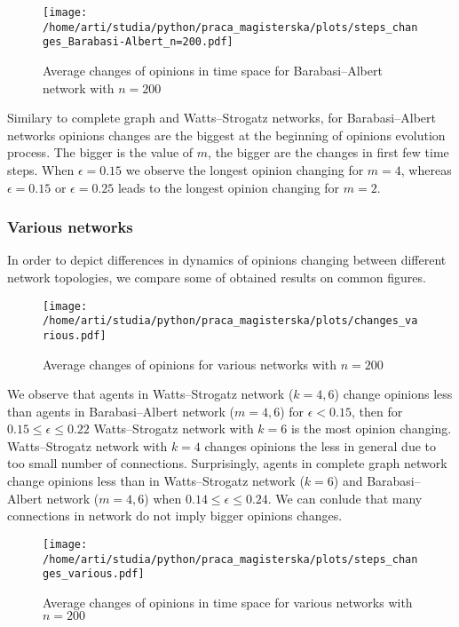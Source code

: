 \documentclass{article}
\begin{document}
\begin{figure}[H]
		\centering
		\texttt{[image: /home/arti/studia/python/praca\_magisterska/plots/steps\_changes\_Barabasi-Albert\_n=200.pdf]}
		\caption{Average changes of opinions in time space for Barabasi--Albert network with $n=200$}
\end{figure}

Similary to complete graph and Watts--Strogatz networks, for Barabasi--Albert networks opinions changes are the biggest at the beginning of opinions evolution process. The bigger is the value of $m$, the bigger are the changes in first few time steps. When $\epsilon=0.15$ we observe the longest opinion changing for $m=4$, whereas $\epsilon=0.15$ or $\epsilon=0.25$ leads to the longest opinion changing for $m=2$.

\subsubsection{Various networks}

In order to depict differences in dynamics of opinions changing between different network topologies, we compare some of obtained results on common figures.

\begin{figure}[H]
		\centering
		\texttt{[image: /home/arti/studia/python/praca\_magisterska/plots/changes\_various.pdf]}
		\caption{Average changes of opinions for various networks with $n=200$}
\end{figure}

We observe that agents in Watts--Strogatz network ($k=4,6$) change opinions less than agents in Barabasi--Albert network ($m=4,6$) for $\epsilon < 0.15$, then for $0.15 \leq \epsilon \leq 0.22$ Watts--Strogatz network with $k=6$ is the most opinion changing. Watts--Strogatz network with $k=4$ changes opinions the less in general due to too small number of connections. Surprisingly, agents in complete graph network change opinions less than in Watts--Strogatz network ($k=6$) and Barabasi--Albert network ($m=4,6$) when $0.14 \leq \epsilon \leq 0.24$. We can conlude that many connections in network do not imply bigger opinions changes.

\begin{figure}[H]
		\centering
		\texttt{[image: /home/arti/studia/python/praca\_magisterska/plots/steps\_changes\_various.pdf]}
		\caption{Average changes of opinions in time space for various networks with $n=200$}
\end{figure}
\end{document}
